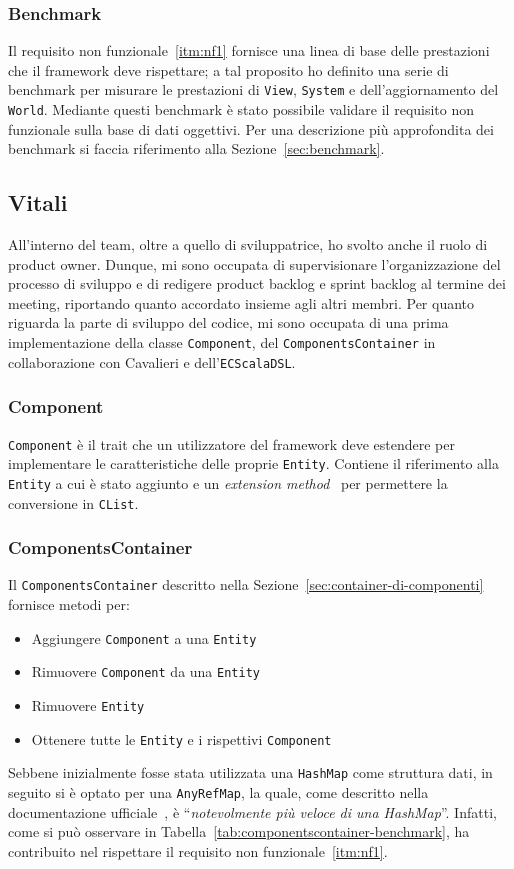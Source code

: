 \subsubsection{Benchmark}
Il requisito non funzionale~\ref{itm:nf1} fornisce una linea di base delle prestazioni che il framework deve rispettare;
a tal proposito ho definito una serie di benchmark per misurare le prestazioni di \texttt{View}, \texttt{System} e
dell'aggiornamento del \texttt{World}.
Mediante questi benchmark è stato possibile validare il requisito non funzionale sulla base di dati oggettivi.
Per una descrizione più approfondita dei benchmark si faccia riferimento alla Sezione~\ref{sec:benchmark}.

\subsection{Vitali}\label{subsec:linda-vitali}
All'interno del team, oltre a quello di sviluppatrice, ho svolto anche il ruolo di product owner.
Dunque, mi sono occupata di supervisionare l'organizzazione del processo di sviluppo e di redigere
product backlog e sprint backlog al termine dei meeting, riportando quanto accordato insieme agli
altri membri.
Per quanto riguarda la parte di sviluppo del codice, mi sono occupata di una prima implementazione della classe
\texttt{Component}, del \texttt{ComponentsContainer} in collaborazione con Cavalieri e dell'\texttt{ECScalaDSL}.

\subsubsection{Component}\label{subsubsec:component-desc}
\texttt{Component} è il trait che un utilizzatore del framework deve estendere per implementare le caratteristiche delle
proprie \texttt{Entity}.
Contiene il riferimento alla \texttt{Entity} a cui è stato aggiunto e un
\textit{extension method}~\cite{extensionmethods} per permettere la conversione in \texttt{CList}.

\subsubsection{ComponentsContainer}\label{subsubsec:components-container}
Il \texttt{ComponentsContainer} descritto nella Sezione~\ref{sec:container-di-componenti} fornisce metodi per:
\begin{itemize}
    \item Aggiungere \texttt{Component} a una \texttt{Entity}
    \item Rimuovere \texttt{Component} da una \texttt{Entity}
    \item Rimuovere \texttt{Entity}
    \item Ottenere tutte le \texttt{Entity} e i rispettivi \texttt{Component}
\end{itemize}
Sebbene inizialmente fosse stata utilizzata una \texttt{HashMap} come struttura dati, in seguito si è optato per una
\texttt{AnyRefMap}, la quale, come descritto nella documentazione ufficiale~\cite{anyRefMap},
è ``\textit{notevolmente più veloce di una HashMap}''.
Infatti, come si può osservare in Tabella~\ref{tab:componentscontainer-benchmark}, ha contribuito nel rispettare il
requisito non funzionale~\ref{itm:nf1}.

